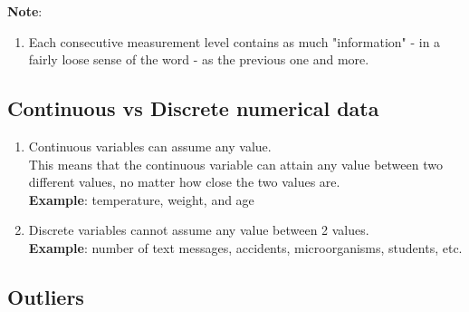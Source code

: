 \vspace{0.3cm}

\textbf{Note}:
\begin{enumerate}
    \item Each consecutive measurement level contains as much "information" - in a fairly loose sense of the word - as the previous one and more. \hfill \cite{statistics/book/Statistics-for-Data-Scientists/Maurits-Kaptein}
\end{enumerate}


\subsection{Continuous vs Discrete numerical data \cite{statistics/book/Statistics-for-Data-Scientists/Maurits-Kaptein}}\label{Data/Measurement-Levels/Continuous vs Discrete numerical data}

\label{Data/Measurement-Levels/Continuous vs Discrete numerical data/Continuous numerical data}
\label{Data/Measurement-Levels/Continuous vs Discrete numerical data/Discrete numerical data}

\begin{enumerate}
    \item Continuous variables can assume any value. \hfill \cite{statistics/book/Statistics-for-Data-Scientists/Maurits-Kaptein} \\
    This means that the continuous variable can attain any value between two different values, no matter how close the two values are. \hfill \cite{statistics/book/Statistics-for-Data-Scientists/Maurits-Kaptein}\\
    \textbf{Example}: temperature, weight, and age \hfill \cite{statistics/book/Statistics-for-Data-Scientists/Maurits-Kaptein}

    \item Discrete variables cannot assume any value between 2 values. \hfill \cite{statistics/book/Statistics-for-Data-Scientists/Maurits-Kaptein}\\
    \textbf{Example}: number of text messages, accidents, microorganisms, students, etc. \hfill \cite{statistics/book/Statistics-for-Data-Scientists/Maurits-Kaptein}
\end{enumerate}


\subsection{Outliers \cite{statistics/book/Statistics-for-Data-Scientists/Maurits-Kaptein}}\label{Data/Measurement-Levels/Outliers}

